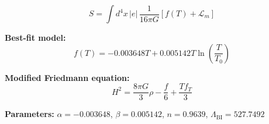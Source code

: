 
\begin{equation}
  S = \int d^4x \, |e| \, \frac{1}{16\pi G} \left[ f(T) + \mathcal{L}_m \right]
\end{equation}

\textbf{Best-fit model:}
\begin{equation}
  f(T) = -0.003648 T + 0.005142 T \ln\!\left(\frac{T}{T_0}\right)
\end{equation}

\textbf{Modified Friedmann equation:}
\begin{equation}
  H^2 = \frac{8\pi G}{3} \rho - \frac{f}{6} + \frac{T f_T}{3}
\end{equation}

\textbf{Parameters:}
$\alpha = -0.003648$, \quad
$\beta = 0.005142$, \quad
$n = 0.9639$, \quad
$\Lambda_{\text{BI}} = 527.7492$